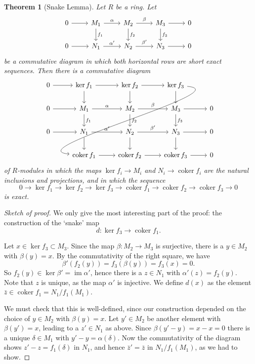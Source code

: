 \documentclass[11pt]{amsbook}
\DeclareMathOperator\im{im}
\DeclareMathOperator\coker{coker}
\theoremstyle{plain}
\newtheorem{theorem}{Theorem}
\theoremstyle{definition}
\begin{document}
\begin{theorem}[Snake Lemma]\label{thm:snake-lemma}
Let $R$ be a ring. Let
\[
\begin{tikzcd}
 0 \arrow{r} 
 	& M_1 \arrow{r}{\alpha} \arrow{d}{f_1}
 	& M_2 \arrow{r}{\beta} \arrow{d}{f_2}
 	& M_3 \arrow{r} \arrow{d}{f_3}
	& 0 \\
0 \arrow{r}
	& N_1 \arrow{r}{\alpha'}
	& N_2 \arrow{r}{\beta'}
	& N_3 \arrow{r}
	& 0
\end{tikzcd}
\]
be a commutative diagram in which both horizontal rows are short exact sequences. Then there is 
a commutative diagram
\[
\begin{tikzcd}
0 \arrow{r} 
 	& \ker f_1 \arrow{d} \arrow{r}
 	& \ker f_2 \arrow{d} \arrow{r}
 	& \ker f_3 \arrow{d} \arrow[out=-5, in=175]{dddll}
	&  \\
 0 \arrow{r} 
 	& M_1 \arrow{r}{\alpha} \arrow{d}{f_1}
 	& M_2 \arrow{r}{\beta} \arrow{d}{f_2}
 	& M_3 \arrow{r} \arrow{d}{f_3}
	& 0 \\
0 \arrow{r}
	& N_1 \arrow{r}{\alpha'} \arrow{d}
	& N_2 \arrow{r}{\beta'} \arrow{d}
	& N_3 \arrow{r} \arrow{d}
	& 0 \\
	& \coker f_1 \arrow{r}
	& \coker f_2 \arrow{r}
	& \coker f_3 \arrow{r} & 0
\end{tikzcd}
\]
of $R$-modules in which the maps $\ker f_i\to M_i$ and $N_i \to \coker f_i$ are the natural inclusions and projections, and
in which the sequence
\[
	0 \to \ker f_1 \to \ker f_2 \to \ker f_3 \to \coker f_1 \to \coker f_2 \to \coker f_3 \to 0
\]
is exact.
\end{theorem}



\begin{proof}[Sketch of proof]
We only give the most interesting part of the proof: the construction of the `snake' map
\[
	d\colon \ker f_3 \to \coker f_1.
\]

Let $x\in \ker f_3 \subset M_3$.  Since the map $\beta\colon M_2\to M_3$ is surjective, there is a $y\in M_2$ with $\beta(y)=x$. By the commutativity of the right square, we have
\[
	\beta'(f_2(y)) = f_3(\beta(y)) = f_3(x) = 0.
\]
So $f_2(y) \in \ker \beta' = \im \alpha'$, hence there is a $z\in N_1$ with $\alpha'(z)=f_2(y)$. Note that $z$ is unique, as the map $\alpha'$ is injective. We define $d(x)$ as the element $\bar{z} \in \coker f_1 = N_1/f_1(M_1)$.

We must check that this is well-defined, since our construction depended on the choice of $y\in M_2$ with $\beta(y)=x$. Let $y'\in M_2$ be another element with $\beta(y')=x$, leading to a $z'\in N_1$ as above.
Since $\beta(y'-y)=x-x=0$ there is a unique $\delta \in M_1$  with $y' -y = \alpha(\delta)$. Now the commutativity of the diagram shows $z'-z=f_1(\delta)$ in $N_1$, and hence $\bar{z}' = \bar{z}$ in $N_1/f_1(M_1)$, as we had to show.
\end{proof}
\end{document}

